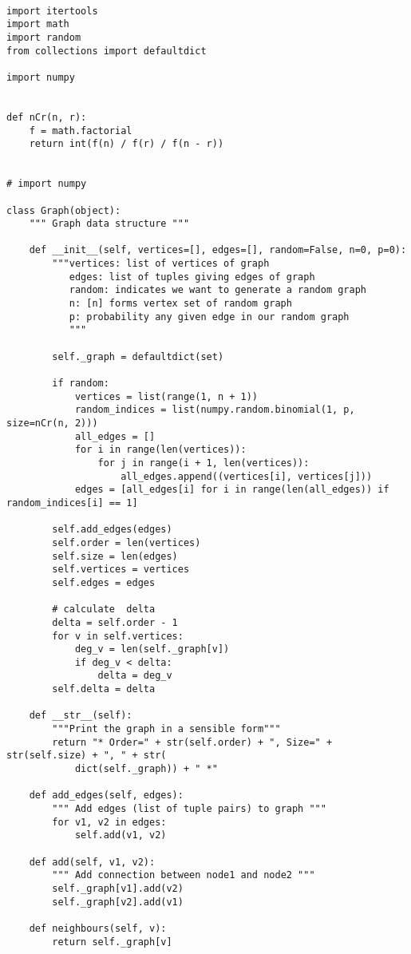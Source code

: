 \documentclass[10pt,a4paper]{report}
\begin{document}
\small\begin{verbatim}

import itertools
import math
import random
from collections import defaultdict

import numpy


def nCr(n, r):
    f = math.factorial
    return int(f(n) / f(r) / f(n - r))


# import numpy

class Graph(object):
    """ Graph data structure """

    def __init__(self, vertices=[], edges=[], random=False, n=0, p=0):
        """vertices: list of vertices of graph
           edges: list of tuples giving edges of graph
           random: indicates we want to generate a random graph
           n: [n] forms vertex set of random graph
           p: probability any given edge in our random graph
           """

        self._graph = defaultdict(set)

        if random:
            vertices = list(range(1, n + 1))
            random_indices = list(numpy.random.binomial(1, p, size=nCr(n, 2)))
            all_edges = []
            for i in range(len(vertices)):
                for j in range(i + 1, len(vertices)):
                    all_edges.append((vertices[i], vertices[j]))
            edges = [all_edges[i] for i in range(len(all_edges)) if random_indices[i] == 1]

        self.add_edges(edges)
        self.order = len(vertices)
        self.size = len(edges)
        self.vertices = vertices
        self.edges = edges

        # calculate  delta
        delta = self.order - 1
        for v in self.vertices:
            deg_v = len(self._graph[v])
            if deg_v < delta:
                delta = deg_v
        self.delta = delta

    def __str__(self):
        """Print the graph in a sensible form"""
        return "* Order=" + str(self.order) + ", Size=" + str(self.size) + ", " + str(
            dict(self._graph)) + " *"

    def add_edges(self, edges):
        """ Add edges (list of tuple pairs) to graph """
        for v1, v2 in edges:
            self.add(v1, v2)

    def add(self, v1, v2):
        """ Add connection between node1 and node2 """
        self._graph[v1].add(v2)
        self._graph[v2].add(v1)

    def neighbours(self, v):
        return self._graph[v]


\end{verbatim}
\end{document}

